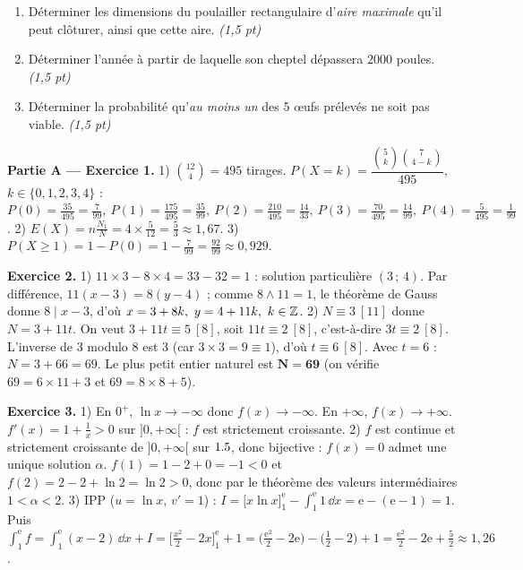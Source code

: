 \begin{enumerate}[label=\textbf{Tâche \arabic*.},leftmargin=2.4em]
\item Déterminer les dimensions du poulailler rectangulaire d'\emph{aire maximale} qu'il peut
clôturer, ainsi que cette aire. \hfill\textit{(1,5 pt)}
\item Déterminer l'année à partir de laquelle son cheptel dépassera $2000$ poules. \hfill\textit{(1,5 pt)}
\item Déterminer la probabilité qu'\emph{au moins un} des $5$ œufs prélevés ne soit pas viable. \hfill\textit{(1,5 pt)}
\end{enumerate}
\par{}


\noindent\textbf{Partie A — Exercice 1.}
1) $\binom{12}{4}=495$ tirages. $P(X{=}k)=\dfrac{\binom5k\binom7{4-k}}{495}$, $k\in\{0,1,2,3,4\}$ :
$P(0)=\frac{35}{495}=\frac7{99},\ P(1)=\frac{175}{495}=\frac{35}{99},\ P(2)=\frac{210}{495}=\frac{14}{33},\ P(3)=\frac{70}{495}=\frac{14}{99},\ P(4)=\frac{5}{495}=\frac1{99}$.
2) $E(X)=n\frac{N_1}{N}=4\times\frac{5}{12}=\frac{5}{3}\approx1{,}67$.
3) $P(X\ge1)=1-P(0)=1-\frac{7}{99}=\frac{92}{99}\approx0{,}929$.

\noindent\textbf{Exercice 2.}
1) $11\times3-8\times4=33-32=1$ : solution particulière $(3\,;\,4)$. Par différence,
$11(x-3)=8(y-4)$ ; comme $8\wedge11=1$, le théorème de Gauss donne $8\mid x-3$, d'où
$x=3+8k,\ y=4+11k,\ k\in\mathbb{Z}$.
2) $N\equiv3\ [11]$ donne $N=3+11t$. On veut $3+11t\equiv5\ [8]$, soit $11t\equiv2\ [8]$, c'est-à-dire
$3t\equiv2\ [8]$. L'inverse de $3$ modulo $8$ est $3$ (car $3\times3=9\equiv1$), d'où $t\equiv6\ [8]$.
Avec $t=6$ : $N=3+66=69$. Le plus petit entier naturel est $\mathbf{N=69}$
(on vérifie $69=6\times11+3$ et $69=8\times8+5$).

\noindent\textbf{Exercice 3.}
1) En $0^+$, $\ln x\to-\infty$ donc $f(x)\to-\infty$. En $+\infty$, $f(x)\to+\infty$.
$f'(x)=1+\frac1x>0$ sur $]0,+\infty[$ : $f$ est strictement croissante.
2) $f$ est continue et strictement croissante de $]0,+\infty[$ sur $1.5$, donc bijective :
$f(x)=0$ admet une unique solution $\alpha$. $f(1)=1-2+0=-1<0$ et $f(2)=2-2+\ln2=\ln2>0$,
donc par le théorème des valeurs intermédiaires $1<\alpha<2$.
3) IPP ($u=\ln x$, $v'=1$) : $I=\big[x\ln x\big]_1^{\mathrm e}-\int_1^{\mathrm e}1\,\dd x=\mathrm e-(\mathrm e-1)=1$.
Puis $\int_1^{\mathrm e}f=\int_1^{\mathrm e}(x-2)\,\dd x+I=\Big[\tfrac{x^2}2-2x\Big]_1^{\mathrm e}+1
=\big(\tfrac{\mathrm e^2}2-2\mathrm e\big)-\big(\tfrac12-2\big)+1=\tfrac{\mathrm e^2}2-2\mathrm e+\tfrac52\approx1{,}26$.


